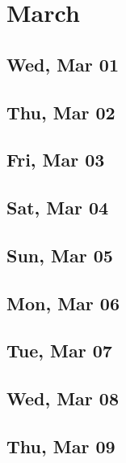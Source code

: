 \chapter{March}
	\section{Wed, Mar 01}
		
		
	\section{Thu, Mar 02}
		
		
	\section{Fri, Mar 03}
		
		
	\section{Sat, Mar 04}
		
		
	\section{Sun, Mar 05}
		
		
	\section{Mon, Mar 06}
		
		
	\section{Tue, Mar 07}
		
		
	\section{Wed, Mar 08}
		
		
	\section{Thu, Mar 09}
		
		
